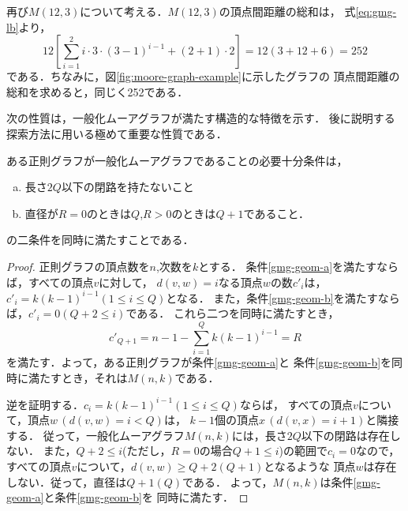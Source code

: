 \begin{example}
  再び$M(12,3)$について考える．$M(12,3)$の頂点間距離の総和は，
  式\ref{eq:gmg-lb}より，
  \[ 12\left[\sum_{i=1}^2i\cdot3\cdot(3-1)^{i-1}+(2+1)\cdot2\right]=
  12(3+12+6)=252\]
  である．ちなみに，図\ref{fig:moore-graph-example}に示したグラフの
  頂点間距離の総和を求めると，同じく252である．
\end{example}

次の性質は，一般化ムーアグラフが満たす構造的な特徴を示す．
後に説明する探索方法に用いる極めて重要な性質である．
\begin{theorem}
  \label{thm:gmg-geometric-property}
  ある正則グラフが一般化ムーアグラフであることの必要十分条件は，
  \begin{enumerate}[(a)]
  \item 長さ$2Q$以下の閉路を持たないこと
    \label{gmg-geom-a}
  \item 直径が$R=0$のときは$Q$,\hspace{1ex}$R>0$のときは$Q+1$であること．
    \label{gmg-geom-b}
  \end{enumerate}
  の二条件を同時に満たすことである．
\end{theorem}
\begin{proof}
  正則グラフの頂点数を$n$,次数を$k$とする．
  条件\ref{gmg-geom-a}を満たすならば，すべての頂点$v$に対して，
  $d(v,w)=i$なる頂点$w$の数$c'_i$は，$c'_i=k(k-1)^{i-1}(1\leq i\leq Q)$となる．
  また，条件\ref{gmg-geom-b}を満たすならば，$c'_i=0(Q+2\leq i)$である．
  これら二つを同時に満たすとき，
  \[ c'_{Q+1}=n-1-\sum_{i=1}^{Q}k(k-1)^{i-1}=R \]
  を満たす．よって，ある正則グラフが条件\ref{gmg-geom-a}と
  条件\ref{gmg-geom-b}を同時に満たすとき，それは$M(n,k)$である．

  逆を証明する．$c_i=k(k-1)^{i-1}(1\leq i\leq Q)$ならば，
  すべての頂点$v$について，頂点$w\,(d(v,w)=i<Q)$は，
  $k-1$個の頂点$x\,(d(v,x)=i+1)$と隣接する．
  従って，一般化ムーアグラフ$M(n,k)$には，長さ$2Q$以下の閉路は存在しない．
  また，$Q+2\leq i$(ただし，$R=0$の場合$Q+1\leq i$)の範囲で$c_i=0$なので，
  すべての頂点$v$について，$d(v,w)\geq Q+2$\hspace{.3ex}$(Q+1)$となるような
  頂点$w$は存在しない．従って，直径は$Q+1$\hspace{.3ex}$(Q)$である．
  よって，$M(n,k)$は条件\ref{gmg-geom-a}と条件\ref{gmg-geom-b}を
  同時に満たす．
\end{proof}
